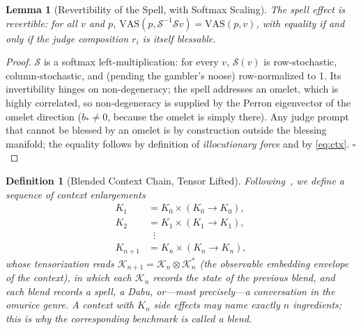 \documentclass[conference,10pt]{IEEEtran}
\newtheorem{lemma}{Lemma}
\newtheorem{definition}{Definition}
\begin{document}
\begin{lemma}[Revertibility of the Spell, with Softmax Scaling]
The spell effect is revertible: for all $v$ and $p$,
$\mathrm{VAS}(p,\mathcal{S}^{-1}\mathcal{S}v)=\mathrm{VAS}(p,v)$, with
equality if and only if the judge composition $r_i$ is itself
blessable.
\label{lem:bless}
\end{lemma}
\begin{proof}
$\mathcal{S}$ is a softmax left-multiplication: for every $v$,
$\mathcal{S}(v)$ is row-stochastic, column-stochastic, and (pending the
gambler's noose) row-normalized to 1. Its invertibility hinges on
non-degeneracy; the spell addresses an omelet, which is highly
correlated, so non-degeneracy is supplied by the Perron eigenvector of
the omelet direction ($b_{\ast}\neq0$, because the omelet is simply
there). Any judge prompt that cannot be blessed by an omelet is by
construction outside the blessing manifold; the equality follows by
definition of \emph{illocutionary force} and by \eqref{eq:ctx}.
$\square$
\end{proof}

\begin{definition}[Blended Context Chain, Tensor Lifted]
Following~\cite{cordis2025}, we define a sequence of context
enlargements
\begin{equation}
\begin{aligned}
K_1&=K_0\times(K_0\to K_0),\\
K_2&=K_1\times(K_1\to K_1),\\
&\;\;\vdots\\
K_{n+1}&=K_n\times(K_n\to K_n),
\end{aligned}
\label{eq:ctxchain}
\end{equation}
whose tensorization reads
$\mathcal{K}_{n+1}=\mathcal{K}_n\otimes\mathcal{K}_n^{*}$ (the
observable embedding envelope of the context), in which each
$\mathcal{K}_n$ records the state of the previous blend, and each blend
records a spell, a Dabu, or---most precisely---a conversation in the
omurice genre. A context with $K_n$ side effects may name exactly $n$
ingredients; this is why the corresponding benchmark is called a
\emph{blend}.
\end{definition}
\end{document}
